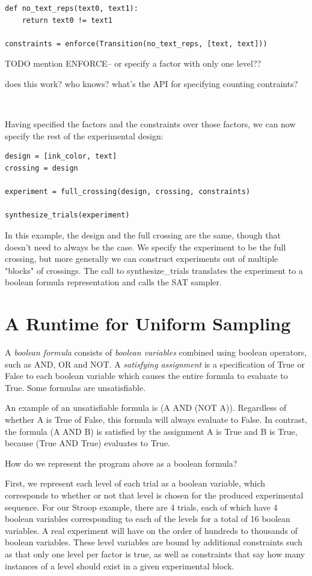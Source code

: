 \begin{lstlisting}
def no_text_reps(text0, text1):
    return text0 != text1

constraints = enforce(Transition(no_text_reps, [text, text]))
\end{lstlisting}

TODO mention ENFORCE-- or specify a factor with only one level??

does this work? who knows? what's the API for specifying counting contraints?

~~~~

Having specified the factors and the constraints over those factors, we can now specify the rest of the experimental design:

\begin{lstlisting}
design = [ink_color, text]
crossing = design

experiment = full_crossing(design, crossing, constraints)

synthesize_trials(experiment)
\end{lstlisting}

In this example, the design and the full crossing are the same, though that doesn't need to always be the case. We specify the experiment to be the full crossing, but more generally we can construct experiments out of multiple "blocks" of crossings. The call to synthesize\_trials translates the experiment to a boolean formula representation and calls the SAT sampler.

\section{A Runtime for Uniform Sampling}

A \emph{boolean formula} consists of \emph{boolean variables} combined using boolean operators, such as AND, OR and NOT. A \emph{satisfying assignment} is a specification of True or False to each boolean variable which causes the entire formula to evaluate to True. Some formulas are unsatisfiable.

An example of an unsatisfiable formula is (A AND (NOT A)). Regardless of whether A is True of False, this formula will always evaluate to False. In contrast, the formula (A AND B) is satisfied by the assignment A is True and B is True, because (True AND True) evaluates to True.

How do we represent the program above as a boolean formula?

First, we represent each level of each trial as a boolean variable, which corresponds to whether or not that level is chosen for the produced experimental sequence. For our Stroop example, there are 4 trials, each of which have 4 boolean variables corresponding to each of the levels for a total of 16 boolean variables. A real experiment will have on the order of hundreds to thousands of boolean variables. These level variables are bound by additional constraints such as that only one level per factor is true, as well as constraints that say how many instances of a level should exist in a given experimental block.

